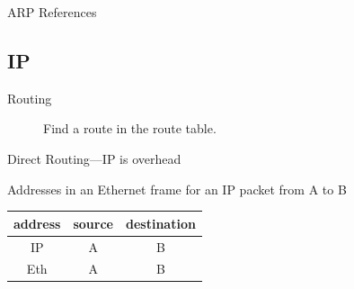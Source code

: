 \begin{frame}{ARP References}
  \begin{refsection}
  \nocite{wiki:arp, rfc826} \printbibliography[heading=none]
\end{refsection}
\end{frame}

\subsection{IP}

\begin{frame}
  \begin{minipage}{.45\linewidth}
    \begin{center}
    \end{center}
  \end{minipage}\hfill
  \begin{minipage}{.45\linewidth}
    \begin{center}
      \label{fig:router}
    \end{center}
  \end{minipage}
  \begin{description}
  \item[Routing] Find a route in the route table.
  \end{description}
\end{frame}

\begin{frame}{Direct Routing---IP is overhead}
    \begin{center}
    \end{center}
  \begin{block}{Addresses in an Ethernet frame for an IP packet from A to B}
    \begin{center}
      \begin{tabular}{ccc}
        \toprule
        address & source & destination\\\midrule
        IP & A & B\\
        Eth & A & B\\\bottomrule
      \end{tabular}
    \end{center}
  \end{block}
\end{frame}


